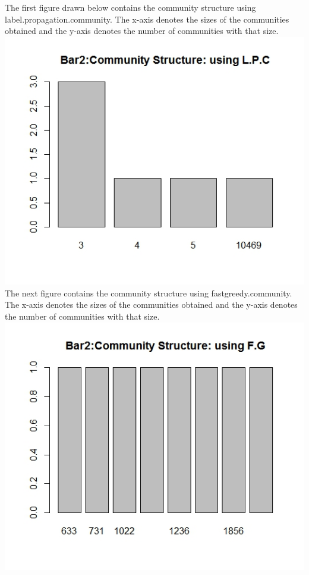 \documentclass{article}
\begin{document}
\begin{itemize}
 The first figure drawn below contains the community structure using label.propagation.community. The x-axis denotes the sizes of the communities obtained
 and the y-axis denotes the number of communities with that size.\\
 \includegraphics[scale=0.4]{p4}\\
 The next figure contains the community structure using fastgreedy.community. The x-axis denotes the sizes of 
 the communities obtained and the y-axis denotes the number of communities with that size.\\
 \includegraphics[scale=0.4]{p5} 
\end{itemize}
\end{document}
